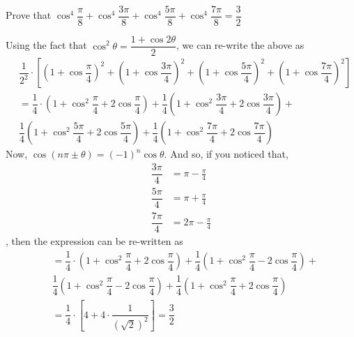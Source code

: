 
\question[4] Prove that $\cos^4\dfrac{\pi}{8} + \cos^4\dfrac{3\pi}{8} + \cos^4\dfrac{5\pi}{8} + \cos^4\dfrac{7\pi}{8} = \dfrac{3}{2}$


\ifprintanswers
\fi 

\begin{solution}[\fullpage]
    Using the fact that $\cos^2\theta = \dfrac{1+\cos 2\theta}{2}$,  we can re-write the above as
    \begin{align}
       &\dfrac{1}{2^2}\cdot\left[\left( 1+\cos\dfrac{\pi}{4}\right)^2 + 
       \left( 1+\cos\dfrac{3\pi}{4}\right)^2
       + \left( 1+\cos\dfrac{5\pi}{4}\right)^2 + 
       \left( 1+\cos\dfrac{7\pi}{4}\right)^2\right] \\
       &= \dfrac{1}{4}\cdot\left( 1 + \cos^2\dfrac{\pi}{4} + 2\cos\dfrac{\pi}{4}\right) +
          \dfrac{1}{4}\left( 1 + \cos^2\dfrac{3\pi}{4} + 2\cos\dfrac{3\pi}{4}\right) + \nonumber \\
       & \dfrac{1}{4}\left( 1 + \cos^2\dfrac{5\pi}{4} + 2\cos\dfrac{5\pi}{4}\right) + 
          \dfrac{1}{4}\left( 1 + \cos^2\dfrac{7\pi}{4} + 2\cos\dfrac{7\pi}{4}\right) 
    \end{align}
    Now, $\cos(n\pi \pm \theta) = (-1)^{n}\cos\theta$. And so, if you noticed that,
    \begin{align}
    	\dfrac{3\pi}{4} &= \pi - \frac{\pi}{4} \\
    	\dfrac{5\pi}{4} &= \pi + \frac{\pi}{4} \\
    	\dfrac{7\pi}{4} &= 2\pi - \frac{\pi}{4}
    \end{align}
    , then the expression can be re-written as 
    \begin{align}
       &= \dfrac{1}{4}\cdot\left( 1 + \cos^2\dfrac{\pi}{4} + 2\cos\dfrac{\pi}{4}\right) +
          \dfrac{1}{4}\left( 1 + \cos^2\dfrac{\pi}{4} - 2\cos\dfrac{\pi}{4}\right) + \nonumber \\
       & \dfrac{1}{4}\left( 1 + \cos^2\dfrac{\pi}{4} - 2\cos\dfrac{\pi}{4}\right) + 
          \dfrac{1}{4}\left( 1 + \cos^2\dfrac{\pi}{4} + 2\cos\dfrac{\pi}{4}\right) \\
       &= \dfrac{1}{4}\cdot\left[ 4 + 4\cdot\dfrac{1}{(\sqrt{2})^2}\right] = \dfrac{3}{2} 
    \end{align}
\end{solution}
